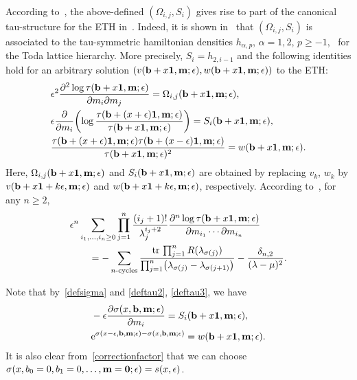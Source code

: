 \documentclass[pdftex]{sigma}
\newcommand{\e}{\epsilon}
\newcommand{\p}{\partial}
\newcommand{\tr}{{\rm tr}}
\newcommand{\nn}{\nonumber}
\numberwithin{equation}{section}
\begin{document}
According to~\cite{DY}, the above-defined $(\Omega_{i,j}, S_i)$ gives rise to part of
the canonical tau-structure for the ETH in~\cite{CDZ, DZ-toda}.
Indeed, it is shown in~\cite{DY} that $(\Omega_{i,j}, S_i)$ is associated to the
tau-symmetric hamiltonian densities $h_{\alpha,p}$, $\alpha=1,2$, $p\ge-1$,~\cite{CDZ, DZ-toda} for the Toda lattice hierarchy.
More precisely, $S_i=h_{2,i-1}$ and the following identities hold
for an arbitrary solution $(v({\bf b}+x{\bf 1},{\bf m};\e), w({\bf b}+x{\bf 1},{\bf m};\e))$ to the ETH:
\begin{align}
& \e^2\frac{\p^2 \log\tau({\bf b}+x{\bf 1},{\bf m};\e)}{\p m_i \p m_j}=\Omega_{i,j}({\bf b}+x{\bf 1},{\bf m};\e),\nn \\%
& \e \frac{\p}{\p m_i} \biggl(\log \frac{\tau({\bf b}+(x+\e){\bf 1},{\bf m};\e)}{\tau({\bf b}+x{\bf 1},{\bf m};\e)}\biggr) =
S_i({\bf b}+x{\bf 1},{\bf m};\e), \label{deftau2} \\
& \frac{\tau({\bf b}+(x+\e){\bf 1},{\bf m};\e)\tau({\bf b}+(x-\e){\bf 1},{\bf m};\e)}{\tau({\bf b}+x{\bf 1},{\bf m};\e)^2} = w({\bf b}+x{\bf 1},{\bf m};\e). \label{deftau3}
\end{align}
Here, $\Omega_{i,j}({\bf b}+x{\bf 1},{\bf m};\e)$ and
$S_i({\bf b}+x{\bf 1},{\bf m};\e)$ are obtained by replacing $v_k$, $w_k$ by $v({\bf b}+x{\bf 1}+k\e,{\bf m};\e)$ and
$w({\bf b}+x{\bf 1}+k\e,{\bf m};\e)$, respectively.
According to~\cite{DY}, for any $n\ge2$,
\begin{align}
&\e^n \sum_{i_1,\dots,i_n\ge0}
\prod_{j=1}^n \frac{(i_j+1)!}{\lambda_j^{i_j+2}} \frac{\p^n \log \tau({\bf b}+x{\bf 1},{\bf m}; \e)}{\p m_{i_1} \cdots \p m_{i_n}}\nn\\
&\qquad{}= - \sum_{\text{$n$-cycles}}
\frac{\tr \, \prod_{j=1}^n R(\lambda_{\sigma(j)})}{\prod_{j=1}^n \bigl(\lambda_{\sigma(j)}-\lambda_{\sigma(j+1)}\bigr)} - \frac{\delta_{n,2}}{(\lambda-\mu)^2}.\label{multiderivativesresolvent}
\end{align}

Note that by~\eqref{defsigma} and \eqref{deftau2}, \eqref{deftau3}, we have
\begin{align}
& - \e\frac{\p \sigma(x, {\bf b},{\bf m};\e)}{\p m_i} = S_i({\bf b}+x{\bf 1},{\bf m};\e), \label{property1sigma} \\
& {\rm e}^{\sigma(x-\e, {\bf b},{\bf m};\e)-\sigma(x, {\bf b},{\bf m};\e)} = w({\bf b}+x{\bf 1},{\bf m};\e). \label{propertysigma}
\end{align}
It is also clear from~\eqref{correctionfactor} that we can choose
$\sigma(x, b_0=0, b_1=0, \dots, {\bf m}={\bf 0};\e)=s(x,\e)$.
\end{document}
